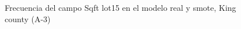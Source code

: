 \begin{figure}[H]
    \centering
    
    \caption{Frecuencia del campo Sqft lot15 en el modelo real y smote, King county (A-3)}
    \label{frecuency-smote-sqft lot15}
\end{figure}